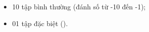 \documentclass[main.tex]{subfiles}
\begin{document}
{}
\begin{itemize}
  \item 10 tập bình thường (đánh số từ -10 đến -1);
  \item 01 tập đặc biệt ({}).
\end{itemize}
\end{document}
